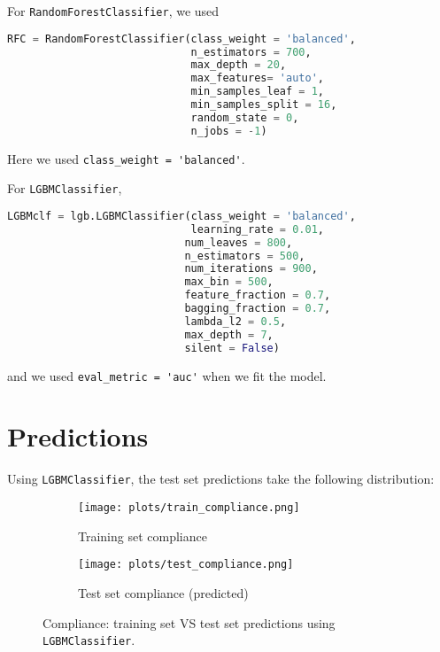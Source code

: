 \documentclass[12pt,letterpaper]{article}
\numberwithin{equation}{section}
\begin{document}
For \verb|RandomForestClassifier|, we used
\begin{lstlisting}[language=Python, basicstyle=\footnotesize]
RFC = RandomForestClassifier(class_weight = 'balanced', 
                             n_estimators = 700, 
                             max_depth = 20, 
                             max_features= 'auto', 
                             min_samples_leaf = 1, 
                             min_samples_split = 16, 
                             random_state = 0, 
                             n_jobs = -1)
\end{lstlisting}
Here we used \verb|class_weight = 'balanced'|.

For \verb|LGBMClassifier|, 
\begin{lstlisting}[language=Python, basicstyle=\footnotesize]
LGBMclf = lgb.LGBMClassifier(class_weight = 'balanced', 
                             learning_rate = 0.01, 
                            num_leaves = 800,
                            n_estimators = 500, 
                            num_iterations = 900, 
                            max_bin = 500, 
                            feature_fraction = 0.7, 
                            bagging_fraction = 0.7,
                            lambda_l2 = 0.5,
                            max_depth = 7,
                            silent = False)
\end{lstlisting}
and we used \verb|eval_metric = 'auc'| when we fit the model.


\section{Predictions}

Using \verb|LGBMClassifier|, the test set predictions take the following distribution:

\begin{figure}[H]
\centering
\begin{subfigure}{0.6\textwidth}
  \centering
  \texttt{[image: plots/train\_compliance.png]}
\caption{Training set compliance}\label{pred1}
\end{subfigure}%
\hspace*{-2cm}
\begin{subfigure}{.6\textwidth}
  \centering
  \texttt{[image: plots/test\_compliance.png]}
  \caption{Test set compliance (predicted)}\label{pred2}
\end{subfigure}
\caption{Compliance: training set VS test set predictions using \texttt{LGBMClassifier}.}
\label{pred}
\end{figure}
\end{document}
